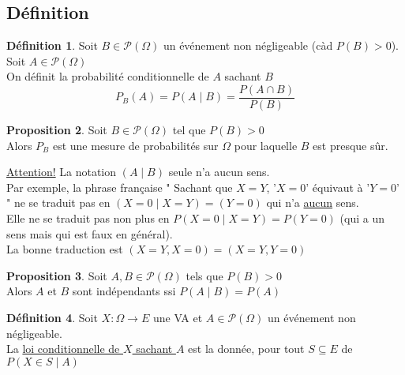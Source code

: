 \documentclass[10pt,a4paper]{article}
\theoremstyle{definition}
\newtheorem{proposition}{Proposition}[section]
\newtheorem{definition}[proposition]{Définition}
\begin{document}
\subsection{Définition}
\begin{definition}
Soit $B \in \mathcal{P}(\Omega)$ un événement non négligeable (càd $P(B) > 0$). Soit $A \in \mathcal{P}(\Omega)$ \\
On définit la probabilité conditionnelle de $A$ sachant $B$
\[ P_B(A) = P(A \mid B) = \frac{P(A \cap B)}{P(B)} \]
\end{definition}
\begin{proposition}
Soit $B \in \mathcal{P}(\Omega)$ tel que $P(B) > 0$ \\
Alors $P_B$ est une mesure de probabilités sur $\Omega$ pour laquelle $B$ est presque sûr.
\end{proposition}
\noindent \uline{Attention!} La notation $(A \mid B)$ seule n'a aucun sens. \\
Par exemple, la phrase française " Sachant que $X = Y$, '$X = 0$' équivaut à '$Y = 0$' " ne se traduit pas en $(X = 0 \mid X = Y) = (Y = 0)$ qui n'a \uline{aucun} sens. \\
Elle ne se traduit pas non plus en $P(X = 0 \mid X = Y) = P(Y = 0)$ (qui a un sens mais qui est faux en général). \\
La bonne traduction est $(X = Y, X = 0) = (X = Y, Y = 0)$
\begin{proposition}
Soit $A, B \in \mathcal{P}(\Omega)$ tels que $P(B) > 0$ \\
Alors $A$ et $B$ sont indépendants ssi $P(A \mid B) = P(A)$
\end{proposition}
\begin{definition}
Soit $X: \Omega \to E$ une VA et $A \in \mathcal{P}(\Omega)$ un événement non négligeable. \\
La \uline{loi conditionnelle de $X$ sachant $A$} est la donnée, pour tout $S \subseteq E$ de $P(X \in S \mid A)$
\end{definition}
\end{document}
